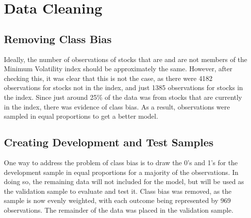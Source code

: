\documentclass[12pt,twoside]{reedthesis}
\theoremstyle{definition}
\theoremstyle{definition}
\theoremstyle{definition}
\theoremstyle{remark}
\begin{document}
\section{Data Cleaning}\label{data-cleaning-1}

\subsection{Removing Class Bias}\label{removing-class-bias}

Ideally, the number of observations of stocks that are and are not
members of the Minimum Volatility index should be approximately the
same. However, after checking this, it was clear that this is not the
case, as there were 4182 observations for stocks not in the index, and
just 1385 observations for stocks in the index. Since just around 25\%
of the data was from stocks that are currently in the index, there was
evidence of class bias. As a result, observations were sampled in equal
proportions to get a better model.

\subsection{Creating Development and Test
Samples}\label{creating-development-and-test-samples}

One way to address the problem of class bias is to draw the 0's and 1's
for the development sample in equal proportions for a majority of the
observations. In doing so, the remaining data will not included for the
model, but will be used as the validation sample to evaluate and test
it. Class bias was removed, as the sample is now evenly weighted, with
each outcome being represented by 969 observations. The remainder of the
data was placed in the validation sample.
\end{document}
